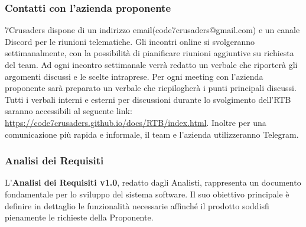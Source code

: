 \subsubsection{Contatti con l’azienda proponente}
7Crusaders dispone di un indirizzo email(code7crusaders@gmail.com) e un canale Discord per le riunioni telematiche. 
Gli incontri online si svolgeranno settimanalmente, con la possibilità di pianificare riunioni aggiuntive su richiesta del team.
Ad ogni incontro settimanale verrà redatto un verbale che riporterà gli argomenti discussi e le scelte intraprese.
Per ogni meeting con l’azienda proponente sarà preparato un verbale che riepilogherà i punti principali discussi. 
Tutti i verbali interni e esterni per discussioni durante lo svolgimento dell'RTB saranno accessibili al seguente link: \url{https://code7crusaders.github.io/docs/RTB/index.html}.
Inoltre per una comunicazione più rapida e informale, il team e l'azienda utilizzeranno Telegram.

\subsubsection{Analisi dei Requisiti}

L'\textbf{Analisi dei Requisiti v1.0}, redatto dagli Analisti, rappresenta un documento fondamentale per lo sviluppo del sistema software. Il suo obiettivo principale è definire in dettaglio le funzionalità necessarie affinché il prodotto soddisfi pienamente le richieste della Proponente.

